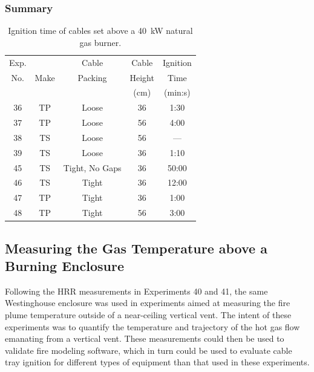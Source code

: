 \clearpage

\subsubsection{Summary}

\begin{table}[ht]
\begin{center}
\caption[Results of cable tray ignition experiments]{Ignition time of cables set above a 40~kW natural gas burner.}
\label{matrix2}
\begin{tabular}{|c|c|c|c|c|}
\hline
Exp.   &          & Cable             & Cable         & Ignition         \\
No.    & Make     & Packing           & Height        & Time             \\
       &          &                   & (cm)          & (min:s)          \\ \hline
36     & TP       & Loose             & 36            & 1:30             \\ \hline
37     & TP       & Loose             & 56            & 4:00             \\ \hline
38     & TS       & Loose             & 56            & ---              \\ \hline
39     & TS       & Loose             & 36            & 1:10             \\ \hline
45     & TS       & Tight, No Gaps    & 36            & 50:00            \\ \hline
46     & TS       & Tight             & 36            & 12:00            \\ \hline
47     & TP       & Tight             & 36            & 1:00             \\ \hline
48     & TP       & Tight             & 56            & 3:00             \\ \hline

\end{tabular}
\end{center}
\end{table}



\clearpage

\subsection{Measuring the Gas Temperature above a Burning Enclosure}

Following the HRR measurements in Experiments 40 and 41, the same Westinghouse enclosure was used in experiments aimed at measuring the fire plume temperature outside of a near-ceiling vertical vent. The intent of these experiments was to quantify the temperature and trajectory of the hot gas flow emanating from a vertical vent. These measurements could then be used to validate fire modeling software, which in turn could be used to evaluate cable tray ignition for different types of equipment than that used in these experiments.

